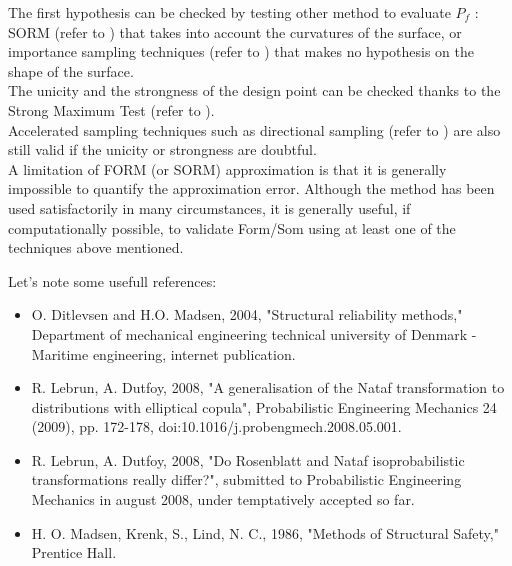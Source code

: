 {\begin{itemize}
    The first hypothesis can be checked by testing other method to evaluate $P_f$ : SORM (refer to
    ) that takes into account the curvatures of the surface, or importance sampling techniques (refer to ) that makes no hypothesis on the shape of the surface.\\
    The unicity and the strongness of the design point can be checked thanks to the Strong Maximum Test (refer to ).\\
    Accelerated sampling techniques such as directional sampling  (refer to ) are also still valid if the unicity or strongness are doubtful.\\
    A limitation of FORM (or SORM) approximation is that it is generally impossible to quantify the approximation error. Although the method has been used satisfactorily in many circumstances, it is generally useful, if computationally possible, to validate Form/Som using at least one of the techniques above mentioned.
  \end{itemize}



  Let's note some usefull references:
  \begin{itemize}
  \item O. Ditlevsen and H.O. Madsen, 2004, "Structural reliability methods," Department of mechanical engineering technical university of Denmark - Maritime engineering, internet publication.
  \item R. Lebrun, A. Dutfoy, 2008, "A generalisation of the Nataf transformation to distributions with elliptical copula", Probabilistic Engineering Mechanics 24 (2009), pp. 172-178, doi:10.1016/j.probengmech.2008.05.001.
  \item R. Lebrun, A. Dutfoy, 2008, "Do Rosenblatt and Nataf isoprobabilistic transformations really differ?", submitted to Probabilistic  Engineering Mechanics in august 2008, under temptatively accepted so far.
  \item H. O. Madsen, Krenk, S., Lind, N. C., 1986, "Methods of Structural Safety," Prentice Hall.
  \end{itemize}
}
